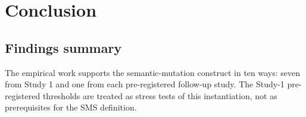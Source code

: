 \documentclass[manuscript,screen,review]{acmart}
\begin{document}


\section{Conclusion}\label{conclusion}

\subsection{Findings summary}\label{findings-summary}

The empirical work supports the semantic-mutation construct in ten ways:
seven from Study 1 and one from each pre-registered follow-up study. The
Study-1 pre-registered thresholds are treated as stress tests of this
instantiation, not as prerequisites for the SMS definition.
\end{document}
